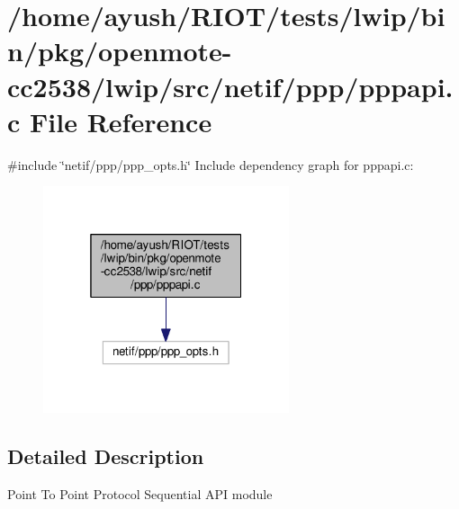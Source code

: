 \hypertarget{openmote-cc2538_2lwip_2src_2netif_2ppp_2pppapi_8c}{}\section{/home/ayush/\+R\+I\+O\+T/tests/lwip/bin/pkg/openmote-\/cc2538/lwip/src/netif/ppp/pppapi.c File Reference}
\label{openmote-cc2538_2lwip_2src_2netif_2ppp_2pppapi_8c}
{\ttfamily \#include \char`\"{}netif/ppp/ppp\+\_\+opts.\+h\char`\"{}}\newline
Include dependency graph for pppapi.\+c\+:
\nopagebreak
\begin{figure}[H]
\begin{center}
\leavevmode
\includegraphics[width=205pt]{openmote-cc2538_2lwip_2src_2netif_2ppp_2pppapi_8c__incl}
\end{center}
\end{figure}


\subsection{Detailed Description}
Point To Point Protocol Sequential A\+PI module 
